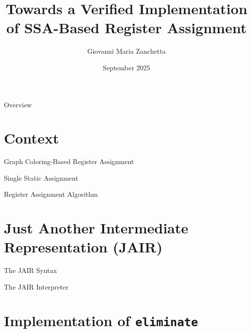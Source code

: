 \documentclass[aspectratio=169,xcolor=dvipsnames]{beamer}
\title{Towards a Verified Implementation of SSA-Based Register Assignment}
\author{Giovanni Maria Zanchetta}
\institute
{
    Advisor: Prof. Marco Patrignani \\
    Co-Advisor: Matthis Kruse \\
}
\date{September 2025}
\begin{document}
\begin{frame}
    \titlepage
\end{frame}

\begin{frame}{Overview}
    \tableofcontents
\end{frame}

\section{Context}
% 

\begin{frame}{Graph Coloring-Based Register Assignment}

\end{frame}

\begin{frame}{Single Static Assignment}

\end{frame}

\begin{frame}{Register Assignment Algorithm}

\end{frame}

\section{Just Another Intermediate Representation (JAIR)}

\begin{frame}{The JAIR Syntax}

\end{frame}

\begin{frame}{The JAIR Interpreter}

\end{frame}

\section{Implementation of \texttt{eliminate}}
\end{document}
